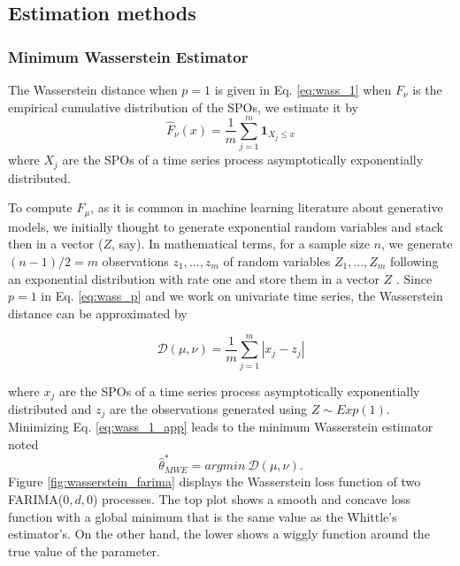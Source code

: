 \documentclass[
  11pt,
]{article}
\begin{document}
\hypertarget{estimation-methods}{%
\subsection{Estimation methods}\label{estimation-methods}}

\hypertarget{minimum-wasserstein-estimator}{%
\subsubsection{Minimum Wasserstein
Estimator}\label{minimum-wasserstein-estimator}}

The Wasserstein distance when \(p=1\) is given in Eq. \ref{eq:wass_1}
when \(F_{\nu}\) is the empirical cumulative distribution of the SPOs,
we estimate it by \[
\hat{F}_{\nu}(x)=\frac{1}{m} \sum_{j=1}^{m} \mathbf{1}_{X_{j} \leq x}
\] where \(X_{j}\) are the SPOs of a time series process asymptotically
exponentially distributed.

To compute \(F_\mu\), as it is common in machine learning literature
about generative models, we initially thought to generate exponential
random variables and stack then in a vector (\(Z\), say). In
mathematical terms, for a sample size \(n\), we generate \((n-1)/2 = m\)
observations \(z_1, ..., z_m\) of random variables \(Z_1, ..., Z_m\)
following an exponential distribution with rate one and store them in a
vector \(Z\) . Since \(p = 1\) in Eq. \ref{eq:wass_p} and we work on
univariate time series, the Wasserstein distance can be approximated by

\begin{equation}
\mathcal{D}(\mu, \nu) = \frac{1}{m} \sum_{j = 1}^{m} |x_j - z_j| 
\label{eq:wass_1_app}
\end{equation}

where \(x_j\) are the SPOs of a time series process asymptotically
exponentially distributed and \(z_j\) are the observations generated
using \(Z \sim Exp(1)\). Minimizing Eq. \ref{eq:wass_1_app} leads to the
minimum Wasserstein estimator noted \[
\hat \theta^*_{MWE} = argmin \  \mathcal{D}(\mu, \nu).
\] Figure \ref{fig:wasserstein_farima} displays the Wasserstein loss
function of two FARIMA(\(0,d,0\)) processes. The top plot shows a smooth
and concave loss function with a global minimum that is the same value
as the Whittle's estimator's. On the other hand, the lower shows a
wiggly function around the true value of the parameter.
\end{document}
